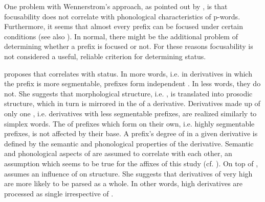 One problem with Wennerstrom's approach, as pointed out by \citet[161 f.]{Raffelsiefen.1999}, is that focusability does not correlate with phonological characteristics of p-words. Furthermore, it seems that almost every prefix can be focused under certain conditions (see also \citealt[chapter 4]{Plag.2003}). In normal,  there might be the additional problem of determining whether a prefix is focused or not. For these reasons focusability is not considered a useful, reliable criterion for determining  status.

\cite{Raffelsiefen.1999} proposes that  correlates with  status. In more  words, i.e. in derivatives in which the prefix is more segmentable, prefixes form independent . In less  words, they do not.
She suggests that morphological structure, i.e. , is translated into prosodic structure, which in turn is mirrored in the  of a derivative. Derivatives made up of only one , i.e. derivatives with less segmentable prefixes, are realized similarly to simplex words. The  of prefixes which form  on their own, i.e. highly segmentable prefixes, is not affected by their base. 
A prefix's degree of  in a given derivative is defined by the semantic and phonological properties of the derivative. 
Semantic and phonological aspects of  are assumed to correlate with each other, an assumption which seems to be true for the affixes of this study (cf. ). On top of , \citet[175 f.]{Raffelsiefen.1999} assumes an influence of  on  structure. 
She suggests that derivatives of very high  are more likely to be parsed as a whole. In other words, high  derivatives are processed as single  irrespective of .



